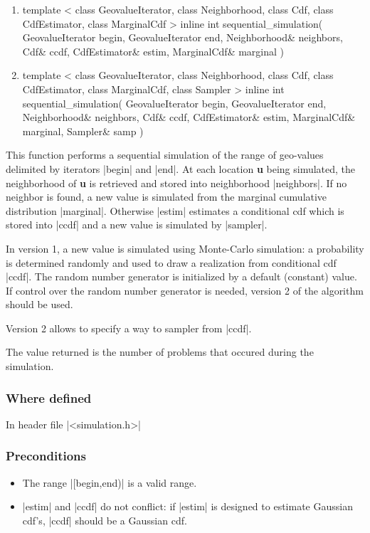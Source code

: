 \documentclass[12pt,twoside]{report}
\newcommand{\loc}[1]{{\bf #1}}
\begin{document}
\begin{enumerate}
\item 
\begin{code}
template
<
  class GeovalueIterator,
  class Neighborhood,
  class Cdf,
  class CdfEstimator,
  class MarginalCdf
>
inline int
sequential_simulation(
  GeovalueIterator begin, GeovalueIterator end,
  Neighborhood& neighbors,
  Cdf& ccdf,
  CdfEstimator& estim,
  MarginalCdf& marginal
)

\end{code}

\item 
\begin{code}
template
<
  class GeovalueIterator,
  class Neighborhood,
  class Cdf,
  class CdfEstimator,
  class MarginalCdf,
  class Sampler
>
inline int 
sequential_simulation(
  GeovalueIterator begin, GeovalueIterator end,
  Neighborhood& neighbors,
  Cdf& ccdf,
  CdfEstimator& estim,
  MarginalCdf& marginal,
  Sampler& samp
)
\end{code}

\end{enumerate}


This function performs a sequential simulation of the range of geo-values delimited by iterators |begin| and |end|. At each location \loc{u} being simulated, the neighborhood of \loc{u} is retrieved and stored into neighborhood  |neighbors|. If no neighbor is found, a new value is simulated from the marginal cumulative distribution |marginal|. Otherwise |estim| estimates a conditional cdf which is stored into |ccdf| and a new value is simulated by |sampler|. 

In version 1, a new value is simulated using Monte-Carlo simulation: a probability is determined randomly and used to draw a realization from conditional cdf |ccdf|. The random number generator is initialized by a default (constant) value. If control over the random number generator is needed, version 2 of the algorithm should be used.

Version 2 allows to specify a way to sampler from |ccdf|.

The value returned is the number of problems that occured during the simulation.

\htmlrule[CLEAR=all]  \subsubsection*{Where defined}
In header file |<simulation.h>|


\htmlrule[CLEAR=all]  \subsubsection*{Preconditions}
\begin{itemize}
\item The range |[begin,end)| is a valid range.

\item |estim| and |ccdf| do not conflict: if |estim| is designed to estimate Gaussian cdf's, |ccdf| should be a Gaussian cdf.
\end{itemize}
\end{document}
